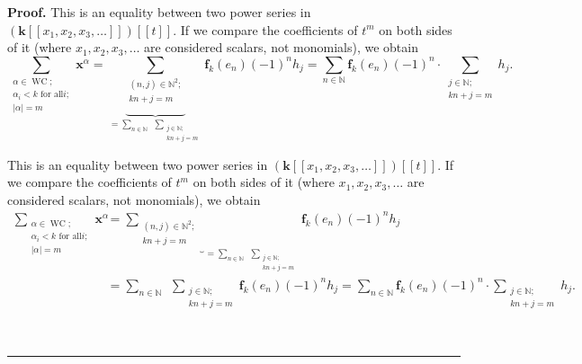 \documentclass[numbers=enddot,12pt,final,onecolumn,notitlepage]{scrartcl}%
\theoremstyle{definition}
\newenvironment{proof}[1][Proof]{\noindent\textbf{#1.} }{\ \rule{0.5em}{0.5em}}
\let\sumnonlimits\sum
\renewcommand{\sum}{\sumnonlimits\limits}
\newenvironment{verlong}{}{}
\newenvironment{vershort}{}{}
\begin{document}
\begin{proof}
\begin{vershort}
\noindent This is an equality between two power series in $\left(
\mathbf{k}\left[  \left[  x_{1},x_{2},x_{3},\ldots\right]  \right]  \right)
\left[  \left[  t\right]  \right]  $. If we compare the coefficients of
$t^{m}$ on both sides of it (where $x_{1},x_{2},x_{3},\ldots$ are considered
scalars, not monomials), we obtain%
\[
\sum_{\substack{\alpha\in\operatorname*{WC};\\\alpha_{i}<k\text{ for all
}i;\\\left\vert \alpha\right\vert =m}}\mathbf{x}^{\alpha}=\underbrace{\sum
_{\substack{\left(  n,j\right)  \in\mathbb{N}^{2};\\kn+j=m}}}_{=\sum
_{n\in\mathbb{N}}\ \ \sum_{\substack{j\in\mathbb{N};\\kn+j=m}}}\mathbf{f}%
_{k}\left(  e_{n}\right)  \left(  -1\right)  ^{n}h_{j}=\sum_{n\in\mathbb{N}%
}\mathbf{f}_{k}\left(  e_{n}\right)  \left(  -1\right)  ^{n}\cdot
\sum_{\substack{j\in\mathbb{N};\\kn+j=m}}h_{j}.
\]

\end{vershort}

\begin{verlong}
\noindent This is an equality between two power series in $\left(
\mathbf{k}\left[  \left[  x_{1},x_{2},x_{3},\ldots\right]  \right]  \right)
\left[  \left[  t\right]  \right]  $. If we compare the coefficients of
$t^{m}$ on both sides of it (where $x_{1},x_{2},x_{3},\ldots$ are considered
scalars, not monomials), we obtain%
\begin{align*}
\sum_{\substack{\alpha\in\operatorname*{WC};\\\alpha_{i}<k\text{ for all
}i;\\\left\vert \alpha\right\vert =m}}\mathbf{x}^{\alpha}  &
=\underbrace{\sum_{\substack{\left(  n,j\right)  \in\mathbb{N}^{2};\\kn+j=m}%
}}_{=\sum_{n\in\mathbb{N}}\ \ \sum_{\substack{j\in\mathbb{N};\\kn+j=m}%
}}\mathbf{f}_{k}\left(  e_{n}\right)  \left(  -1\right)  ^{n}h_{j}\\
&  =\sum_{n\in\mathbb{N}}\ \ \sum_{\substack{j\in\mathbb{N};\\kn+j=m}%
}\mathbf{f}_{k}\left(  e_{n}\right)  \left(  -1\right)  ^{n}h_{j}=\sum
_{n\in\mathbb{N}}\mathbf{f}_{k}\left(  e_{n}\right)  \left(  -1\right)
^{n}\cdot\sum_{\substack{j\in\mathbb{N};\\kn+j=m}}h_{j}.
\end{align*}


\end{verlong}
\end{proof}
\end{document}
